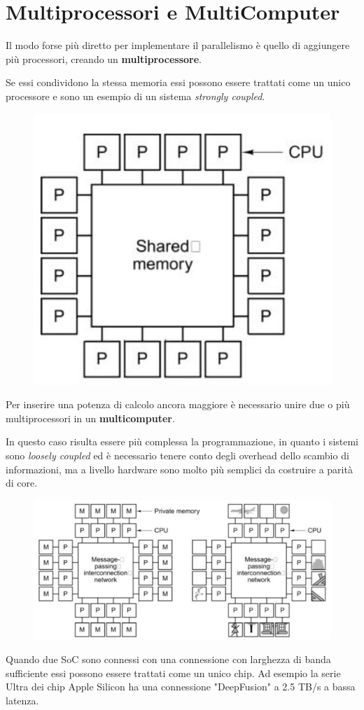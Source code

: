 \section{Multiprocessori e MultiComputer}
Il modo forse più diretto per implementare il parallelismo è quello di aggiungere più processori, creando un \textbf{multiprocessore}.

Se essi condividono la stessa memoria essi possono essere trattati come un unico processore e sono un esempio di un sistema \textit{strongly coupled}.

\begin{figure}[H]
    \centering
    \includegraphics[width=0.28\linewidth]{assets/multiprocessore.jpg}
\end{figure}

Per inserire una potenza di calcolo ancora maggiore è necessario unire due o più multiprocessori in un \textbf{multicomputer}.

In questo caso risulta essere più complessa la programmazione, in quanto i sistemi sono \textit{loosely coupled} ed è necessario tenere conto degli overhead dello scambio di informazioni, ma a livello hardware sono molto più semplici da costruire a parità di core.

\begin{figure}[H]
    \centering
    \includegraphics[width=0.62\linewidth]{assets/multicomputer.png}
\end{figure}

\begin{note}
    Quando due SoC sono connessi con una connessione con larghezza di banda sufficiente essi possono essere trattati come un unico chip. Ad esempio la serie Ultra dei chip Apple Silicon ha una connessione "DeepFusion" a 2.5 TB/s a bassa latenza.
\end{note}

